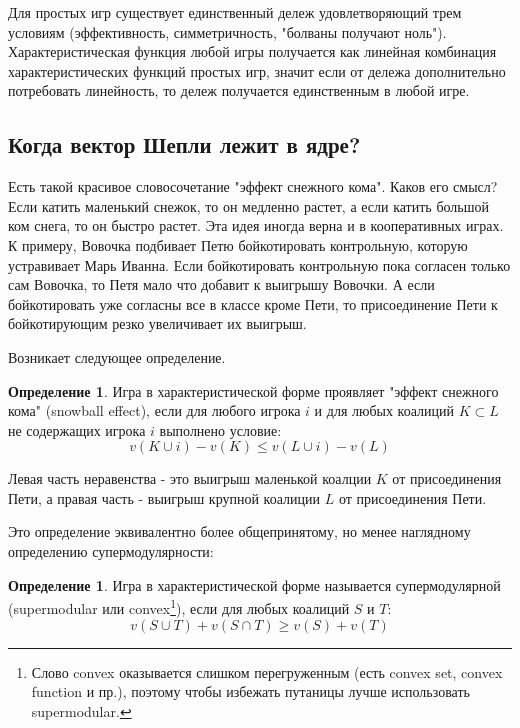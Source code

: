 \documentclass[pdftex,12pt,a4paper]{article}
\numberwithin{equation}{page} %
\theoremstyle{definition} %
\newtheorem{definition}[equation]{Определение}
\theoremstyle{definition}
\theoremstyle{definition}
\begin{document}
Для простых игр существует единственный дележ удовлетворяющий трем условиям (эффективность, симметричность, "болваны получают ноль"). Характеристическая функция любой игры получается как линейная комбинация характеристических функций простых игр, значит если от дележа дополнительно потребовать линейность, то дележ получается единственным в любой игре.


\subsection{Когда вектор Шепли лежит в ядре?}

Есть такой красивое словосочетание "эффект снежного кома". Каков его смысл? Если катить маленький снежок, то он медленно растет, а если катить большой ком снега, то он быстро растет. Эта идея иногда верна и в кооперативных играх. К примеру, Вовочка подбивает Петю бойкотировать контрольную, которую устравивает Марь Иванна. Если бойкотировать контрольную пока согласен только сам Вовочка, то Петя мало что добавит к выигрышу Вовочки. А если бойкотировать уже согласны все в классе кроме Пети, то присоединение Пети к бойкотирующим резко увеличивает их выигрыш.

Возникает следующее определение.
\begin{definition}
Игра в характеристической форме проявляет "эффект снежного кома" (snowball effect), если для любого игрока $i$ и для любых коалиций $K\subset L$ не содержащих игрока $i$ выполнено условие:
\begin{equation}
v(K\cup i)-v(K)\leq v(L\cup i)-v(L)
\end{equation}
\end{definition}

Левая часть неравенства - это выигрыш маленькой коалции $K$ от присоединения Пети, а правая часть - выигрыш крупной коалиции $L$ от присоединения Пети.

Это определение эквивалентно более общепринятому, но менее наглядному определению супермодулярности:
\begin{definition}
Игра в характеристической форме называется супермодулярной (supermodular или convex\footnote{Слово convex оказывается слишком перегруженным (есть convex set, convex function и пр.), поэтому чтобы избежать путаницы лучше использовать supermodular.}), если для любых коалиций $S$ и $T$:
\begin{equation}
v(S\cup T)+v(S\cap T)\geq v(S)+v(T)
\end{equation}
\end{definition}
\end{document}

